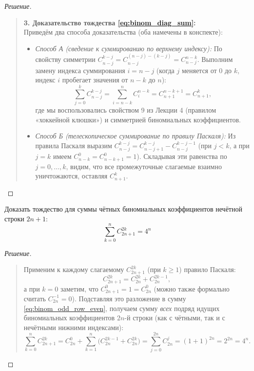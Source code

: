 \begin{proof}[Решение]
\begin{quote}
        \textbf{3. Доказательство тождества \eqref{eq:binom_diag_sum}:}\\
        Приведём два способа доказательства (оба намечены в конспекте):
        \begin{itemize}
            \item \emph{Способ А (сведение к суммированию по верхнему 
            индексу):} По свойству симметрии $C_{n-j}^{k-j} = C_{n-j}^{(n-j)-(k-j)} 
            = C_{n-j}^{n-k}$. Выполним замену индекса суммирования 
            $i = n - j$ (когда $j$ меняется от $0$ до $k$, индекс $i$ 
            пробегает значения от $n - k$ до $n$):
            \[
                \sum_{j=0}^{k} C_{n-j}^{k-j} = 
                \sum_{i=n-k}^{n} C_i^{n-k} = C_{n+1}^{n-k+1} = C_{n+1}^k,
            \]
            где мы воспользовались свойством 9 из Лекции 4 (правилом 
            «хоккейной клюшки») и симметрией биномиальных коэффициентов.
            \item \emph{Способ Б (телескопическое суммирование по правилу 
            Паскаля):} Из правила Паскаля выразим $C_{n-j}^{k-j} = 
            C_{n-j+1}^{k-j} - C_{n-j}^{k-j-1}$ (при $j < k$, а при $j = k$ 
            имеем $C_{n-k}^0 = C_{n-k+1}^0 = 1$). Складывая эти равенства 
            по $j = 0, \dots, k$, видим, что все промежуточные слагаемые 
            взаимно уничтожаются, оставляя $C_{n+1}^k$.
        \end{itemize}
    \end{quote}
\end{proof}

\begin{problem}
    Доказать тождество для суммы чётных биномиальных коэффициентов 
    нечётной строки $2n + 1$:
    \begin{equation} \label{eq:binom_odd_row_even}
        \sum_{k=0}^{n} C_{2n+1}^{2k} = 4^n \tag{9}
    \end{equation}
\end{problem}

\begin{proof}[Решение]~\\
    \begin{quote}
        Применим к каждому слагаемому $C_{2n+1}^{2k}$ (при $k \ge 1$) 
        правило Паскаля:
        \[
            C_{2n+1}^{2k} = C_{2n}^{2k} + C_{2n}^{2k-1},
        \]
        а при $k = 0$ заметим, что $C_{2n+1}^0 = 1 = C_{2n}^0$ (можно 
        также формально считать $C_{2n}^{-1} = 0$). Подставляя это 
        разложение в сумму \eqref{eq:binom_odd_row_even}, получаем сумму 
        \emph{всех} подряд идущих биномиальных коэффициентов $2n$-й строки 
        (как с чётными, так и с нечётными нижними индексами):
        \[
            \sum_{k=0}^{n} C_{2n+1}^{2k} = 
            C_{2n}^0 + \sum_{k=1}^{n} \bigl(C_{2n}^{2k-1} + C_{2n}^{2k}\bigr) = 
            \sum_{j=0}^{2n} C_{2n}^j = (1 + 1)^{2n} = 2^{2n} = 4^n.
        \]
    \end{quote}
\end{proof}

